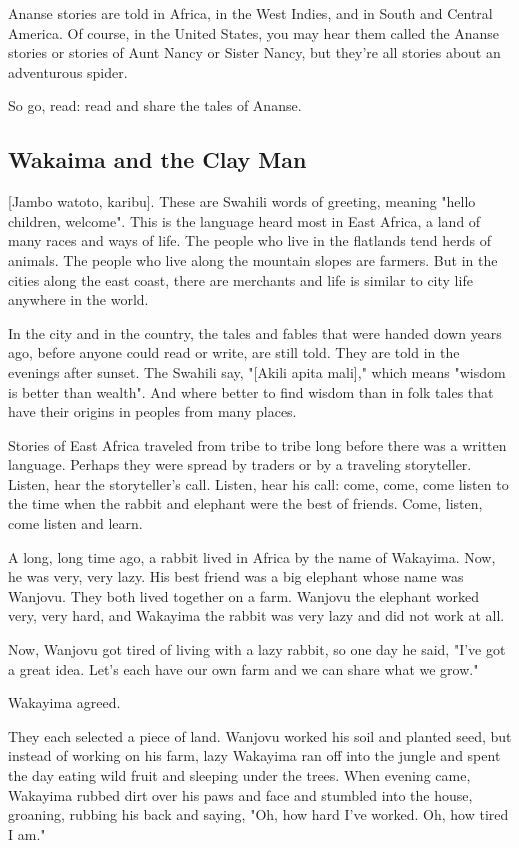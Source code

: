 Ananse stories are told in Africa, in the West Indies, and in South and Central America. Of course, in the United States, you may hear them called the Ananse stories or stories of Aunt Nancy or Sister Nancy, but they're all stories about an adventurous spider.

So go, read: read and share the tales of Ananse.

\subsection{Wakaima and the Clay Man}

[Jambo watoto, karibu]. These are Swahili words of greeting, meaning "hello children, welcome". This is the language heard most in East Africa, a land of many races and ways of life. The people who live in the flatlands tend herds of animals. The people who live along the mountain slopes are farmers. But in the cities along the east coast, there are merchants and life is similar to city life anywhere in the world.

In the city and in the country, the tales and fables that were handed down years ago, before anyone could read or write, are still told. They are told in the evenings after sunset. The Swahili say, "[Akili apita mali]," which means "wisdom is better than wealth". And where better to find wisdom than in folk tales that have their origins in peoples from many places.

Stories of East Africa traveled from tribe to tribe long before there was a written language. Perhaps they were spread by traders or by a traveling storyteller. Listen, hear the storyteller's call. Listen, hear his call: come, come, come listen to the time when the rabbit and elephant were the best of friends. Come, listen, come listen and learn.

A long, long time ago, a rabbit lived in Africa by the name of Wakayima. Now, he was very, very lazy. His best friend was a big elephant whose name was Wanjovu. They both lived together on a farm. Wanjovu the elephant worked very, very hard, and Wakayima the rabbit was very lazy and did not work at all.

Now, Wanjovu got tired of living with a lazy rabbit, so one day he said, "I've got a great idea. Let's each have our own farm and we can share what we grow."

Wakayima agreed.

They each selected a piece of land. Wanjovu worked his soil and planted seed, but instead of working on his farm, lazy Wakayima ran off into the jungle and spent the day eating wild fruit and sleeping under the trees. When evening came, Wakayima rubbed dirt over his paws and face and stumbled into the house, groaning, rubbing his back and saying, "Oh, how hard I've worked. Oh, how tired I am."

